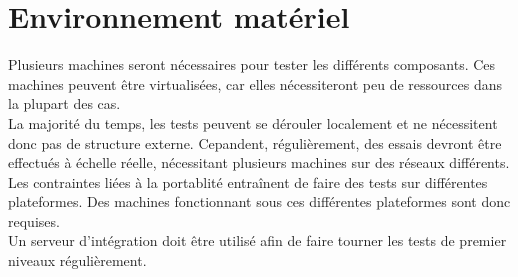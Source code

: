 \section{Environnement matériel}
Plusieurs machines seront nécessaires pour tester les différents composants. Ces machines peuvent être virtualisées, car elles nécessiteront peu de ressources dans la plupart des cas.\\

La majorité du temps, les tests peuvent se dérouler localement et ne nécessitent donc pas de structure externe. Cepandent, régulièrement, des essais devront être effectués à échelle réelle, nécessitant plusieurs machines sur des réseaux différents.\\

Les contraintes liées à la portablité entraînent de faire des tests sur différentes plateformes. Des machines fonctionnant sous ces différentes plateformes sont donc requises.\\

Un serveur d'intégration doit être utilisé afin de faire tourner les tests de premier niveaux régulièrement.\\
